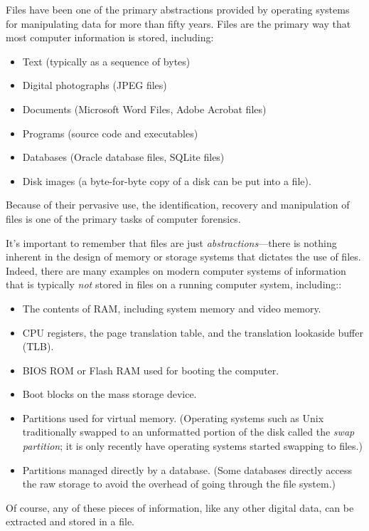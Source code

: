 Files have been one of the primary abstractions provided by operating
systems for manipulating data for more than fifty years. Files are
the primary way that most computer information is stored, including:

\begin{itemize}
\item Text (typically as a sequence of bytes)
\item Digital photographs (\eg JPEG files)
\item Documents (\eg Microsoft Word Files, Adobe Acrobat files)
\item Programs (\eg source code and executables)
\item Databases (\eg Oracle database files, SQLite files)
\item Disk images (a byte-for-byte copy of a disk can be put into a file).
\end{itemize}

Because of their pervasive use, the identification, recovery and
manipulation of files is one of the primary tasks of computer
forensics. 

It's important to remember that files are just
\emph{abstractions}---there is nothing inherent in the design of
memory or storage systems that dictates the use of files. Indeed,
there are many examples on modern computer systems of information that
is typically \emph{not} stored in files on a running computer system, including::

\begin{itemize}
\item The contents of RAM, including system memory and video memory.
\item CPU registers, the page translation table, and the translation
  lookaside buffer (TLB).
\item BIOS ROM or Flash RAM used for booting the computer.
\item Boot blocks on the mass storage device.
\item Partitions used for virtual memory. (Operating systems such
  as Unix traditionally swapped to an unformatted portion of the disk
  called the \emph{swap partition}; it is only recently
  have operating systems started swapping to files.)
\item Partitions managed directly by a database. (Some databases
  directly access the raw storage to avoid the overhead of going
  through the file system.)
\end{itemize}

Of course, any of these pieces of information, like any other digital
data, can be extracted and stored in a file.

